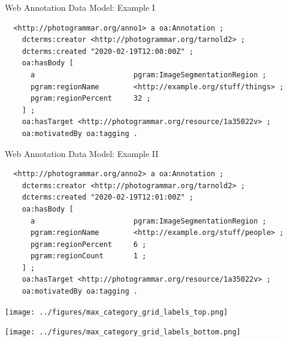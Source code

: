 \documentclass[12pt,ignorenonframetext,aspectratio=169]{beamer}
\begin{document}
\begin{frame}[fragile]{Web Annotation Data Model: Example I}

\fontsize{9}{11}\selectfont

  \begin{verbatim}
  <http://photogrammar.org/anno1> a oa:Annotation ;
    dcterms:creator <http://photogrammar.org/tarnold2> ;
    dcterms:created "2020-02-19T12:00:00Z" ;
    oa:hasBody [
      a                       pgram:ImageSegmentationRegion ;
      pgram:regionName        <http://example.org/stuff/things> ;
      pgram:regionPercent     32 ;
    ] ;
    oa:hasTarget <http://photogrammar.org/resource/1a35022v> ;
    oa:motivatedBy oa:tagging .
  \end{verbatim}

\end{frame}


\begin{frame}[fragile]{Web Annotation Data Model: Example II}

\fontsize{9}{11}\selectfont

  \begin{verbatim}
  <http://photogrammar.org/anno2> a oa:Annotation ;
    dcterms:creator <http://photogrammar.org/tarnold2> ;
    dcterms:created "2020-02-19T12:01:00Z" ;
    oa:hasBody [
      a                       pgram:ImageSegmentationRegion ;
      pgram:regionName        <http://example.org/stuff/people> ;
      pgram:regionPercent     6 ;
      pgram:regionCount       1 ;
    ] ;
    oa:hasTarget <http://photogrammar.org/resource/1a35022v> ;
    oa:motivatedBy oa:tagging .
  \end{verbatim}

\end{frame}


\begin{frame}{}

\begin{center}
\texttt{[image: ../figures/max\_category\_grid\_labels\_top.png]}
\end{center}

\end{frame}

\begin{frame}{}

\begin{center}
\texttt{[image: ../figures/max\_category\_grid\_labels\_bottom.png]}
\end{center}

\end{frame}
\end{document}
